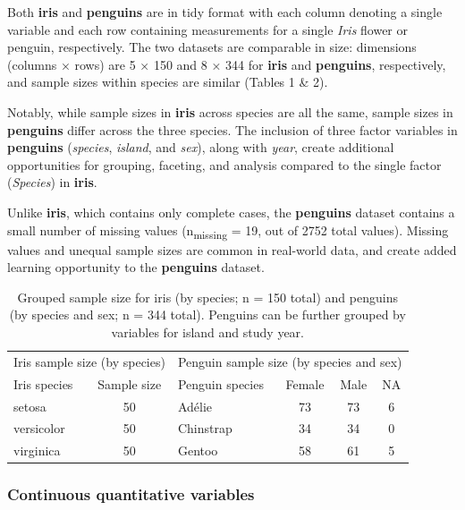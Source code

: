 Both \textbf{iris} and \textbf{penguins} are in tidy format
\citep{wickham_tidy_2014} with each column denoting a single variable
and each row containing measurements for a single \emph{Iris} flower or
penguin, respectively. The two datasets are comparable in size:
dimensions (columns × rows) are 5 × 150 and 8 × 344 for \textbf{iris}
and \textbf{penguins}, respectively, and sample sizes within species are
similar (Tables 1 \& 2).

Notably, while sample sizes in \textbf{iris} across species are all the
same, sample sizes in \textbf{penguins} differ across the three species.
The inclusion of three factor variables in \textbf{penguins}
(\emph{species}, \emph{island}, and \emph{sex}), along with \emph{year},
create additional opportunities for grouping, faceting, and analysis
compared to the single factor (\emph{Species}) in \textbf{iris}.

Unlike \textbf{iris}, which contains only complete cases, the
\textbf{penguins} dataset contains a small number of missing values
(n\textsubscript{missing} = 19, out of 2752 total values). Missing
values and unequal sample sizes are common in real-world data, and
create added learning opportunity to the \textbf{penguins} dataset.

\begin{Schunk}
\begin{table}

\caption{\label{tab:counts-tbl}Grouped sample size for iris (by species; n = 150 total) and penguins (by species and sex; n = 344 total). Penguins can be further grouped by variables for island and study year.}
\centering
\begin{tabular}[t]{lclccc}
\toprule
\multicolumn{2}{c}{Iris sample size (by species)} & \multicolumn{4}{c}{Penguin sample size (by species and sex)} \\
\cmidrule(l{3pt}r{3pt}){1-2} \cmidrule(l{3pt}r{3pt}){3-6}
Iris species & Sample size & Penguin species & Female & Male & NA\\
\midrule
setosa & 50 & Adélie & 73 & 73 & 6\\
versicolor & 50 & Chinstrap & 34 & 34 & 0\\
virginica & 50 & Gentoo & 58 & 61 & 5\\
\bottomrule
\end{tabular}
\end{table}

\end{Schunk}

\hypertarget{continuous-quantitative-variables}{%
\subsubsection{Continuous quantitative
variables}\label{continuous-quantitative-variables}}

